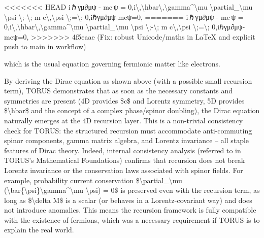 \documentclass[]{article}
\begin{document}
<<<<<<< HEAD
i ℏ γμ∂μψ  -  mc ψ  =  0,i\textbackslash,\textbackslash hbar\textbackslash,\textbackslash gamma\^{}\textbackslash mu
\textbackslash partial\_\textbackslash mu \textbackslash psi
\textbackslash;-\textbackslash; m c\textbackslash,\textbackslash psi
\textbackslash;=\textbackslash; 0,iℏγμ∂μ\hspace{0pt}ψ-mcψ=0,
=======
i ℏ γμ∂μψ  -  mc ψ  =  0,i\textbackslash{},\textbackslash{}hbar\textbackslash{},\textbackslash{}gamma\^{}\textbackslash{}mu
\textbackslash{}partial\_\textbackslash{}mu \textbackslash{}psi
\textbackslash{};-\textbackslash{}; m
c\textbackslash{},\textbackslash{}psi
\textbackslash{};=\textbackslash{}; 0,iℏγμ∂μ​ψ-mcψ=0,
>>>>>>> 4f5eaae (Fix: robust Unicode/maths in LaTeX and explicit push to main in workflow)

which is the usual equation governing fermionic matter like electrons.

By deriving the Dirac equation as shown above (with a possible small
recursion term), TORUS demonstrates that as soon as the necessary
constants and symmetries are present (4D provides \$c\$ and Lorentz
symmetry, 5D provides \$\textbackslash{}hbar\$ and the concept of a
complex phase/spinor doubling), the Dirac equation naturally emerges at
the 4D recursion layer. This is a non-trivial consistency check for
TORUS: the structured recursion must accommodate anti-commuting spinor
components, gamma matrix algebra, and Lorentz invariance -- all staple
features of Dirac theory. Indeed, internal consistency analysis
(referred to in TORUS's Mathematical Foundations) confirms that
recursion does not break Lorentz invariance or the conservation laws
associated with spinor fields. For example, probability current
conservation \$\textbackslash{}partial\_\textbackslash{}mu
(\textbackslash{}bar\{\textbackslash{}psi\}\textbackslash{}gamma\^{}\textbackslash{}mu
\textbackslash{}psi) = 0\$ is preserved even with the recursion term, as
long as \$\textbackslash{}delta M\$ is a scalar (or behaves in a
Lorentz-covariant way) and does not introduce anomalies. This means the
recursion framework is fully compatible with the existence of fermions,
which was a necessary requirement if TORUS is to explain the real world.
\end{document}
